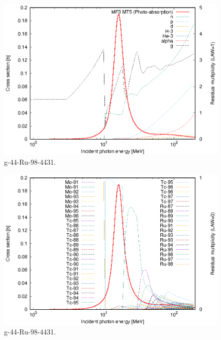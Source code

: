 \begin{figure}
 \includegraphics[width=\linewidth]{eps/g_44-Ru-98_4431.eps}
  \caption{g-44-Ru-98-4431.}
\end{figure}
\begin{figure}
 \includegraphics[width=\linewidth]{eps-law0/g_44-Ru-98_4431.eps}
 \caption{g-44-Ru-98-4431.}
\end{figure}
\newpage \clearpage


